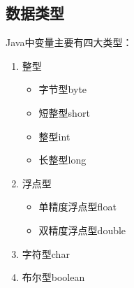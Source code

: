 \vspace{0.5cm}

\subsection{数据类型}

Java中变量主要有四大类型：

\begin{enumerate}
	\item 整型
	      \begin{itemize}
		      \item 字节型byte
		      \item 短整型short
		      \item 整型int
		      \item 长整型long
	      \end{itemize}

	\item 浮点型
	      \begin{itemize}
		      \item 单精度浮点型float
		      \item 双精度浮点型double
	      \end{itemize}

	\item 字符型char

	\item 布尔型boolean
\end{enumerate}

\begin{table}[H]
	\centering
	\caption{不同数据类型的取值范围}
\end{table}

